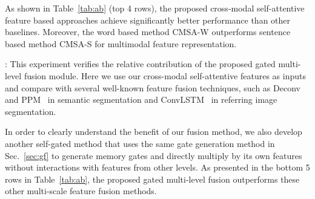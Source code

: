 \documentclass[10pt,twocolumn,letterpaper]{article}
\begin{document}
As shown in Table~\ref{tab:ab} (top 4 rows), the proposed cross-modal self-attentive feature based approaches achieve significantly better performance than other baselines. Moreover, the word based method CMSA-W outperforms sentence based method CMSA-S for multimodal feature representation.

: This experiment verifies the relative contribution of the proposed gated multi-level fusion module. Here we use our cross-modal self-attentive features as inputs and compare with several well-known feature fusion techniques, such as Deconv~\cite{noh2015learning} and PPM~\cite{zhao2017pyramid} in semantic segmentation and ConvLSTM~\cite{li2018referring} in referring image segmentation. 

In order to clearly understand the benefit of our fusion method, we also develop another self-gated method that uses the same gate generation method in Sec.~\ref{sec:gf} to generate memory gates and directly multiply by its own features without interactions with features from other levels. As presented in the bottom 5 rows in Table~\ref{tab:ab}, the proposed gated multi-level fusion outperforms these other multi-scale feature fusion methods.
\end{document}
